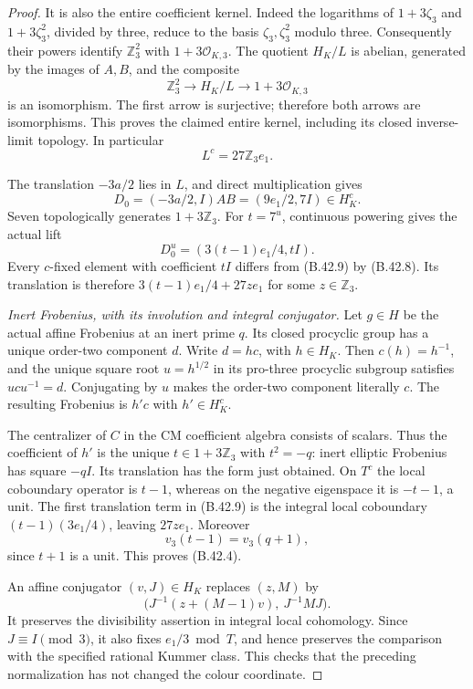 \begin{proof}
It is also the entire coefficient kernel.  Indeed the logarithms
of $1+3\zeta_3$ and $1+3\zeta_3^2$, divided by three,
reduce to the basis $\zeta_3,\zeta_3^2$ modulo three.
Consequently their powers identify $\mathbb Z_3^2$ with
$1+3\mathcal O_{K,3}$.  The quotient $H_K/L$ is abelian,
generated by the images of $A,B$, and the composite
\[
 \mathbb Z_3^2\longrightarrow H_K/L
       \longrightarrow1+3\mathcal O_{K,3}
\]
is an isomorphism.  The first arrow is surjective; therefore
both arrows are isomorphisms.  This proves the claimed entire
kernel, including its closed inverse-limit topology.  In particular
\[
                         L^c=27\mathbb Z_3e_1.              \tag{B.42.8}
\]

The translation $-3a/2$ lies in $L$, and direct multiplication gives
\[
 D_0=(-3a/2,I)AB=(9e_1/2,7I)\in H_K^c.
\]
Seven topologically generates $1+3\mathbb Z_3$.
For $t=7^u$, continuous powering gives the actual lift
\[
                  D_0^u=(3(t-1)e_1/4,tI).                 \tag{B.42.9}
\]
Every $c$-fixed element with coefficient $tI$ differs from
(B.42.9) by (B.42.8).  Its translation is therefore
$3(t-1)e_1/4+27ze_1$ for some $z\in\mathbb Z_3$.

\emph{Inert Frobenius, with its involution and integral conjugator.}
Let $g\in H$ be the actual affine Frobenius at an inert prime $q$.
Its closed procyclic group has a unique order-two component $d$.
Write $d=hc$, with $h\in H_K$.  Then $c(h)=h^{-1}$, and the
unique square root $u=h^{1/2}$ in its pro-three procyclic subgroup
satisfies $ucu^{-1}=d$.  Conjugating by $u$ makes the order-two
component literally $c$.  The resulting Frobenius is $h'c$ with
$h'\in H_K^c$.

The centralizer of $C$ in the CM coefficient algebra consists of
scalars.  Thus the coefficient of $h'$ is the unique
$t\in1+3\mathbb Z_3$ with $t^2=-q$: inert elliptic Frobenius
has square $-qI$.  Its translation has the form just obtained.
On $T^c$ the local coboundary operator is $t-1$, whereas on the
negative eigenspace it is $-t-1$, a unit.  The first translation
term in (B.42.9) is the integral local coboundary
$(t-1)(3e_1/4)$, leaving $27ze_1$.
Moreover
\[
                       v_3(t-1)=v_3(q+1),
\]
since $t+1$ is a unit.  This proves (B.42.4).

An affine conjugator $(v,J)\in H_K$ replaces $(z,M)$ by
\[
 \bigl(J^{-1}(z+(M-1)v),\ J^{-1}MJ\bigr).
\]
It preserves the divisibility assertion in integral local
cohomology.  Since $J\equiv I\pmod3$, it also fixes
$e_1/3\bmod T$, and hence preserves the comparison with the
specified rational Kummer class.  This checks that the preceding
normalization has not changed the colour coordinate.


\end{proof}
